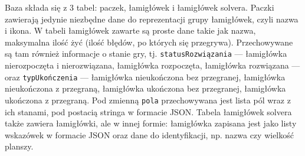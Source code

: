 	Baza składa się z 3 tabel: paczek, łamigłówek i łamigłówek solvera. Paczki zawierają jedynie
niezbędne dane do reprezentacji grupy łamigłówek, czyli nazwa i ikona. W tabeli łamigłówek zawarte
są proste dane takie jak nazwa, maksymalna ilość żyć (ilość błędów, po których się przegrywa).
Przechowywane są tam również informacje o stanie gry, tj. \texttt{statusRozwiązania} — łamigłówka
nierozpoczęta i nierozwiązana, łamigłówka rozpoczęta, łamigłówka rozwiązana — oraz \texttt{typUkończenia} — łamigłówka nieukończona bez przegranej, łamigłówka nieukończona z przegraną, łamigłówka ukończona
bez przegranej, łamigłówka ukończona z przegraną. Pod zmienną \texttt{pola} przechowywana jest lista
pól wraz z ich stanami, pod postacią stringa w formacie JSON. Tabela łamigłówek solvera także zawiera
łamigłówki, ale w innej formie: łamigłówka zapisana jest jako listy wskazówek w formacie JSON oraz dane
do identyfikacji, np. nazwa czy wielkość planszy.
